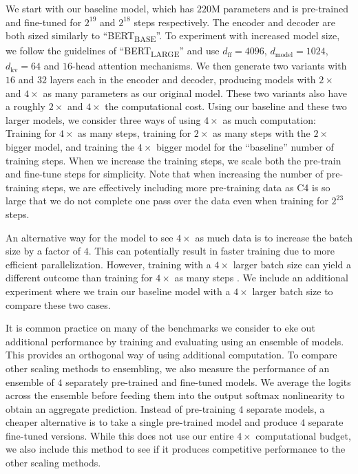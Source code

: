 We start with our baseline model, which has $220\mathrm{M}$ parameters and is pre-trained and fine-tuned for $2^{19}$ and $2^{18}$ steps respectively. The encoder and decoder are both sized similarly to ``BERT\textsubscript{BASE}''.
To experiment with increased model size, we follow the guidelines of ``BERT\textsubscript{LARGE}'' \cite{devlin2018bert} and use $d_{\mathrm{ff}} = 4096$, $d_{\mathrm{model}} = 1024$, $d_{\mathrm{kv}} = 64$ and $16$-head attention mechanisms. We then generate two variants with $16$ and $32$ layers each in the encoder and decoder, producing models with $2\times$ and $4\times$ as many parameters as our original model. These two variants also have a roughly $2\times$ and $4\times$ the computational cost. Using our baseline and these two larger models, we consider three ways of using $4\times$ as much computation: Training for $4\times$ as many steps, training for $2\times$ as many steps with the $2\times$ bigger model, and training the $4\times$ bigger model for the ``baseline'' number of training steps. When we increase the training steps, we scale both the pre-train and fine-tune steps for simplicity. Note that when increasing the number of pre-training steps, we are effectively including more pre-training data as C4 is so large that we do not complete one pass over the data even when training for $2^{23}$ steps.

An alternative way for the model to see $4\times$ as much data is to increase the batch size by a factor of $4$. This can potentially result in faster training due to more efficient parallelization. However, training with a $4\times$ larger batch size can yield a different outcome than training for $4\times$ as many steps \citep{shallue2018measuring}. We include an additional experiment where we train our baseline model with a $4\times$ larger batch size to compare these two cases.

It is common practice on many of the benchmarks we consider to eke out additional performance by training and evaluating using an ensemble of models. This provides an orthogonal way of using additional computation. To compare other scaling methods to ensembling, we also measure the performance of an ensemble of $4$ separately pre-trained and fine-tuned models. We average the logits across the ensemble before feeding them into the output $\mathrm{softmax}$ nonlinearity to obtain an aggregate prediction. Instead of pre-training $4$ separate models, a cheaper alternative is to take a single pre-trained model and produce $4$ separate fine-tuned versions. While this does not use our entire $4\times$ computational budget, we also include this method to see if it produces competitive performance to the other scaling methods.

